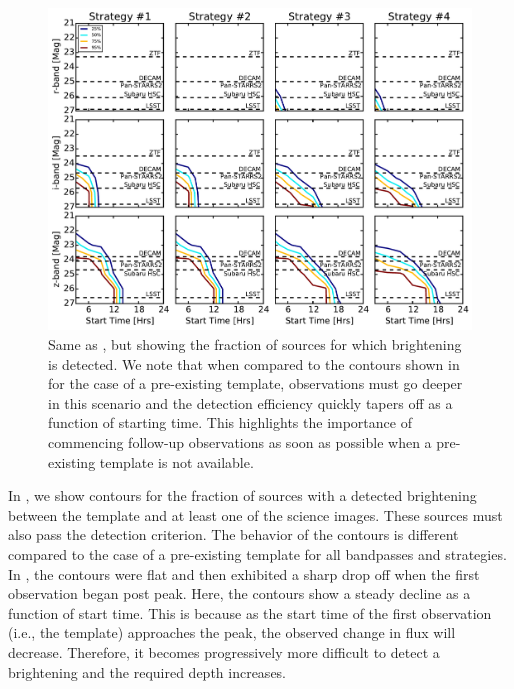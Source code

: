 \begin{figure}[t!]
\centering
\includegraphics[width=\textwidth]{./figs/chapter2/ch2_f13.pdf}
\caption{Same as , but showing the fraction of sources for which brightening is detected. We note that when compared to the contours shown in  for the case of a pre-existing template, observations must go deeper in this scenario and the detection efficiency quickly tapers off as a function of starting time. This highlights the importance of commencing follow-up observations as soon as possible when a pre-existing template is not available.}
\label{fig:ch2_risediff}
\end{figure}

In , we show contours for the fraction of sources with a detected brightening between the template and at least one of the science images. These sources must also pass the detection criterion. The behavior of the contours is different compared to the case of a pre-existing template for all bandpasses and strategies. In , the contours were flat and then exhibited a sharp drop off when the first observation began post peak. Here, the contours show a steady decline as a function of start time. This is because as the start time of the first observation (i.e., the template) approaches the peak, the observed change in flux will decrease. Therefore, it becomes progressively more difficult to detect a brightening and the required depth increases.


